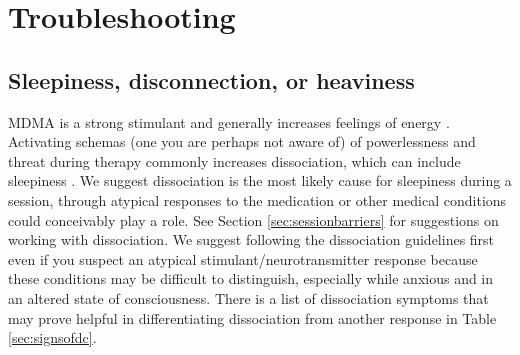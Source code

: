 \documentclass[12pt,letterpaper]{book}
\begin{document}
\section{Troubleshooting}
\label{sec:troubleshooting}
\subsection*{Sleepiness, disconnection, or heaviness}
MDMA is a strong stimulant and generally increases feelings of energy \cite{vizeliActuteEffects}. Activating schemas (one you are perhaps not aware of) of powerlessness and threat during therapy commonly increases dissociation, which can include sleepiness \cite{kozlowskaDefenseCascade}. We suggest dissociation is the most likely cause for sleepiness during a session, through atypical responses to the medication or other medical conditions could conceivably play a role. See Section \ref{sec:sessionbarriers} for suggestions on working with dissociation. We suggest following the dissociation guidelines first even if you suspect an atypical stimulant/neurotransmitter response because these conditions may be difficult to distinguish, especially while anxious and in an altered state of consciousness. There is a list of dissociation symptoms that may prove helpful in differentiating dissociation from another response in Table \ref{sec:signsofdc}.
\end{document}

